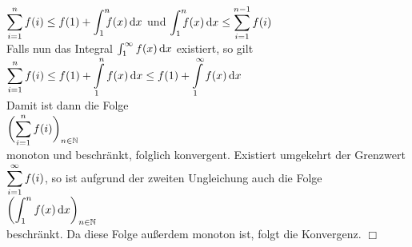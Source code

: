 \hspace*{1.3cm}
$\ds \sum\limits_{i=1}^n f(i) \leq f(1) + \dint{1}{n} f(x)\, \dr x$
\quad und \quad
$\dint{1}{n} f(x)\, \dr x \leq \sum\limits_{i=1}^{n-1} f(i)$
\\[0.2cm]
Falls nun das Integral $\int_{1}^\infty f(x)\, \textrm{d} x$ existiert, so gilt
\\[0.2cm]
\hspace*{1.3cm}
$\displaystyle \sum\limits_{i=1}^{n} f(i) \leq f(1) + \int\limits_{1}^n f(x)\, \textrm{d} x \leq f(1) + \int\limits_{1}^\infty f(x)\, \textrm{d} x$
\\[0.2cm]
Damit ist dann die Folge 
\\
\hspace*{1.3cm}
$\displaystyle \biggl(\sum\limits_{i=1}^{n}  f(i)\biggr)_{n\in\mathbb{N}}$ 
\\ 
monoton und beschr\"ankt, folglich konvergent.  Existiert umgekehrt der Grenzwert
$\displaystyle \sum\limits_{i=1}^{\infty} f(i)$, so  ist aufgrund der zweiten Ungleichung auch die Folge
\\[0.3cm]
\hspace*{1.3cm}
$\displaystyle \biggl(\int_{1}^n f(x)\, \textrm{d} x\biggr)_{n\in\mathbb{N}}$
\\[0.3cm]
beschr\"ankt.  Da diese Folge au{\ss}erdem monoton ist, folgt die Konvergenz. \hspace*{\fill} $\Box$
\vspace*{0.3cm}

